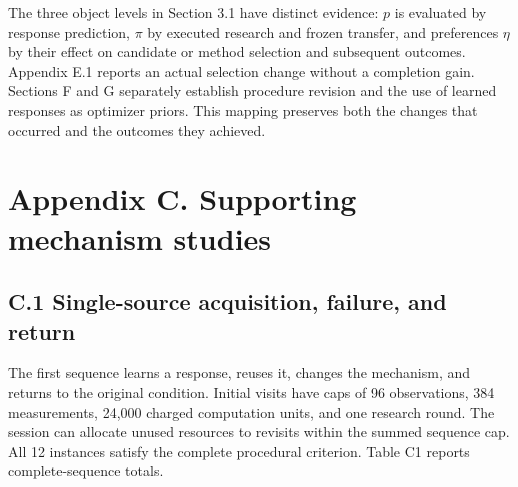 \documentclass[11pt,a4paper]{article}
\begin{document}
The three object levels in Section 3.1 have distinct evidence: \(p\) is evaluated by response prediction, \(\pi\) by executed research and frozen transfer, and preferences \(\eta\) by their effect on candidate or method selection and subsequent outcomes. Appendix E.1 reports an actual selection change without a completion gain. Sections F and G separately establish procedure revision and the use of learned responses as optimizer priors. This mapping preserves both the changes that occurred and the outcomes they achieved.


\section*{Appendix C. Supporting mechanism studies}

\subsection*{C.1 Single-source acquisition, failure, and return}

The first sequence learns a response, reuses it, changes the mechanism, and returns to the original condition. Initial visits have caps of 96 observations, 384 measurements, 24,000 charged computation units, and one research round. The session can allocate unused resources to revisits within the summed sequence cap. All 12 instances satisfy the complete procedural criterion. Table C1 reports complete-sequence totals.
\end{document}
